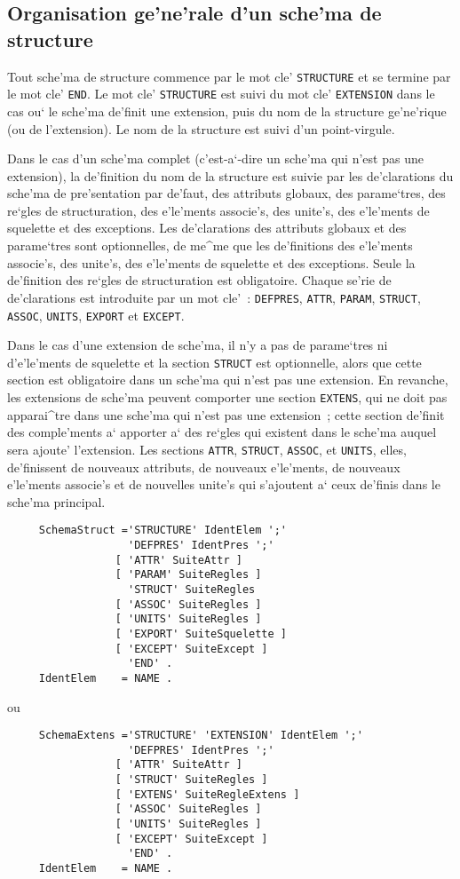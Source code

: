 \subsection{Organisation ge'ne'rale d'un sche'ma de structure}

Tout sche'ma de structure commence par le mot cle' {\tt STRUCTURE} et se
termine par le mot cle' {\tt END}. Le mot cle' {\tt STRUCTURE} est suivi du
mot cle' {\tt EXTENSION} dans le cas ou` le sche'ma de'finit une extension,
puis du nom de la structure ge'ne'rique (ou de l'extension). Le nom de la
structure est suivi d'un point-virgule.

Dans le cas d'un sche'ma complet (c'est-a`-dire un sche'ma qui n'est pas une
extension), la de'finition du nom de la structure est suivie par les
de'clarations du sche'ma de pre'sentation par de'faut, des attributs globaux,
des parame`tres, des re`gles de structuration, des e'le'ments associe's, des
unite's, des e'le'ments de squelette et des exceptions. Les de'clarations des
attributs globaux et des parame`tres sont optionnelles, de me^me que les
de'finitions des e'le'ments associe's, des unite's, des e'le'ments de
squelette et des exceptions. Seule la de'finition des re`gles de structuration
est obligatoire. Chaque se'rie de de'clarations est introduite par un mot cle'~:
{\tt DEFPRES}, {\tt ATTR}, {\tt PARAM}, {\tt STRUCT}, {\tt ASSOC},
{\tt UNITS}, {\tt EXPORT} et {\tt EXCEPT}.

Dans le cas d'une extension de sche'ma, il n'y a pas de parame`tres ni
d'e'le'ments de squelette et la section {\tt STRUCT} est optionnelle, alors
que cette section est obligatoire dans un sche'ma qui n'est pas une extension.
En revanche, les extensions de sche'ma peuvent comporter une section
{\tt EXTENS}, qui ne doit pas apparai^tre dans une sche'ma qui n'est pas
une extension~; cette section de'finit des comple'ments a` apporter
a` des re`gles qui existent dans le sche'ma auquel sera ajoute' l'extension.
Les sections {\tt ATTR}, {\tt STRUCT}, {\tt ASSOC}, et {\tt UNITS}, elles,
de'finissent de nouveaux attributs, de nouveaux e'le'ments, de nouveaux
e'le'ments associe's et de nouvelles unite's qui s'ajoutent a` ceux
de'finis dans le sche'ma principal.

\begin{verbatim}
     SchemaStruct ='STRUCTURE' IdentElem ';'
                   'DEFPRES' IdentPres ';'
                 [ 'ATTR' SuiteAttr ]
                 [ 'PARAM' SuiteRegles ]
                   'STRUCT' SuiteRegles
                 [ 'ASSOC' SuiteRegles ]
                 [ 'UNITS' SuiteRegles ]
                 [ 'EXPORT' SuiteSquelette ]
                 [ 'EXCEPT' SuiteExcept ]
                   'END' .
     IdentElem    = NAME .
\end{verbatim}
ou
\begin{verbatim}
     SchemaExtens ='STRUCTURE' 'EXTENSION' IdentElem ';'
                   'DEFPRES' IdentPres ';'
                 [ 'ATTR' SuiteAttr ]
                 [ 'STRUCT' SuiteRegles ]
                 [ 'EXTENS' SuiteRegleExtens ]
                 [ 'ASSOC' SuiteRegles ]
                 [ 'UNITS' SuiteRegles ]
                 [ 'EXCEPT' SuiteExcept ]
                   'END' .
     IdentElem    = NAME .
\end{verbatim}

